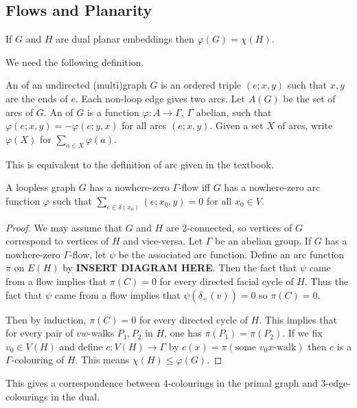 \documentclass[main.tex]{subfiles}
\begin{document}
\subsection{Flows and Planarity}
\begin{theorem}
  If $G$ and $H$ are dual planar embeddings then $\varphi(G) = \chi(H)$.
\end{theorem}
We need the following definition.
\begin{definition*}
  An  of an undirected (multi)graph $G$ is an ordered triple
  $(e;x,y)$ such that $x,y$ are the ends of $e$.
  Each non-loop edge gives two arcs.
  Let $A(G)$ be the set of arcs of $G$.
  An  of $G$ is a function $\varphi:A\to\Gamma$,
  $\Gamma$ abelian, such that $\varphi(e;x,y) = -\varphi(e;y,x)$ for all
  arcs $(e;x,y)$.
  Given a set $X$ of arcs, write $\varphi(X)$ for $\sum_{a\in X}\varphi(a)$.
\end{definition*}
This is equivalent to the definition of arc given in the textbook.
\begin{exercise*}
  A loopless graph $G$ has a nowhere-zero $\Gamma$-flow iff $G$ has a
  nowhere-zero arc function $\varphi$ such that
  $\sum_{e\in\delta(x_0)}(e;x_0,y) = 0$ for all $x_0\in V$.
\end{exercise*}
\begin{proof}
  We may assume that $G$ and $H$ are 2-connected, so vertices of $G$ correspond
  to vertices of $H$ and vice-versa.
  Let $\Gamma$ be an abelian group.
  If $G$ has a nowhere-zero $\Gamma$-flow, let $\psi$ be the associated arc
  function.
  Define an arc function $\pi$ on $E(H)$ by \textbf{INSERT DIAGRAM HERE}.
  Then the fact that $\psi$ came from a flow implies that $\pi(C) = 0$ for
  every directed facial cycle of $H$.
  Thus the fact that $\psi$ came from a flow implies that $\psi(\delta_+(v)) = 0$
  so $\pi(C) = 0$.

  Then by induction, $\pi(C) = 0$ for every directed cycle of $H$.
  This implies that for every pair of $vw$-walks $P_1,P_2$ in $H$,
  one has $\pi(P_1) = \pi(P_2)$.
  If we fix $v_0\in V(H)$ and define $c:V(H)\to\Gamma$ by
  $c(x) = \pi(\text{some $v_0x$-walk})$ then $c$ is a $\Gamma$-colouring of $H$.
  This means $\chi(H)\leq\varphi(G)$.
\end{proof}
\begin{remark*}
  This gives a correspondence between 4-colourings in the primal graph
  and 3-edge-colourings in the dual.
\end{remark*}
\end{document}
